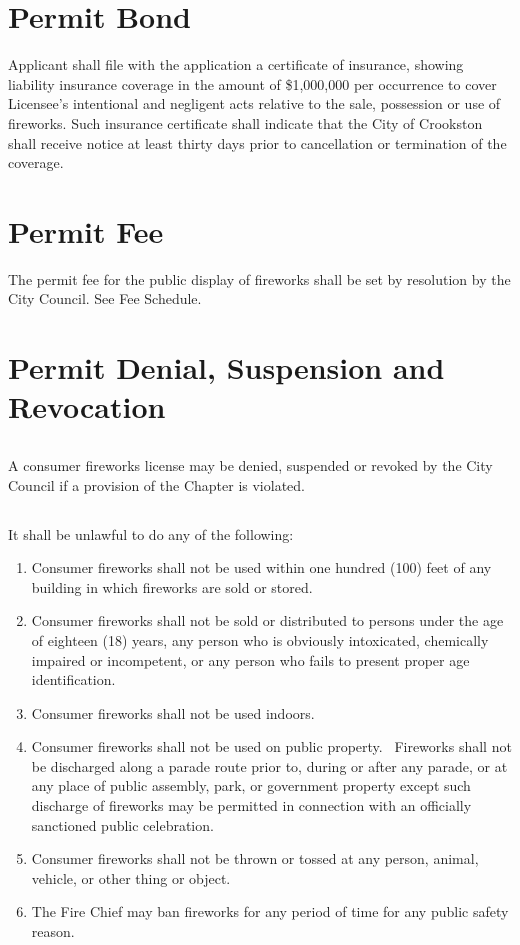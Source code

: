 \section{Permit Bond}
Applicant shall file with the application a certificate of insurance, showing liability insurance coverage in the amount of \$1,000,000 per occurrence to cover Licensee's intentional and negligent acts relative to the sale, possession or use of fireworks. Such insurance certificate shall indicate that the City of Crookston shall receive notice at least thirty days prior to cancellation or termination of the coverage.
\section{Permit Fee}
The permit fee for the public display of fireworks shall be set by resolution by the City Council. See Fee Schedule.
\section{Permit Denial, Suspension and Revocation}
\subsection{}
A consumer fireworks license may be denied, suspended or revoked by the City Council if a provision of the Chapter is violated.
\subsection{}
It shall be unlawful to do any of the following:
\begin{enumerate}[{\indent}1)]
    \item Consumer fireworks shall not be used within one hundred (100) feet of any building in which fireworks are sold or stored.
    \item Consumer fireworks shall not be sold or distributed to persons under the age of eighteen (18) years, any person who is obviously intoxicated, chemically impaired or incompetent, or any person who fails to present proper age identification.
    \item Consumer fireworks shall not be used indoors.
    \item Consumer fireworks shall not be used on public property.  Fireworks shall not be discharged along a parade route prior to, during or after any parade, or at any place of public assembly, park, or government property except such discharge of fireworks may be permitted in connection with an officially sanctioned public celebration.
    \item Consumer fireworks shall not be thrown or tossed at any person, animal, vehicle, or other thing or object.
    \item The Fire Chief may ban fireworks for any period of time for any public safety reason.
\end{enumerate}
